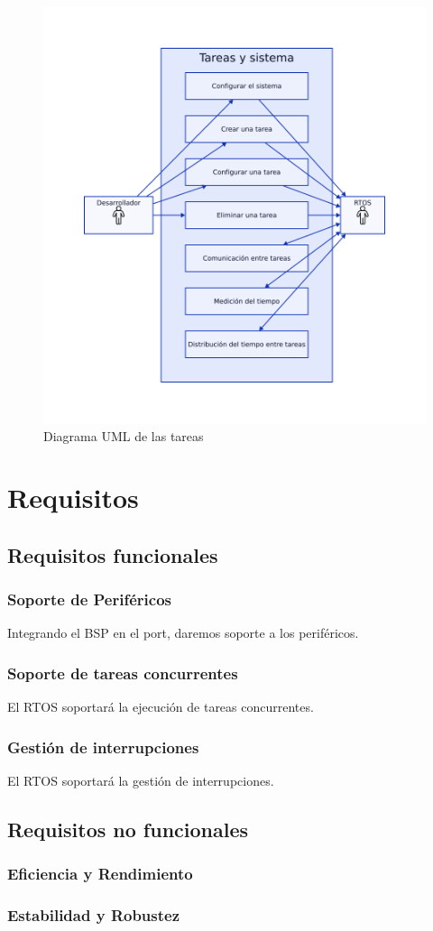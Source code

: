 \begin{figure}[h]
\centering
\includegraphics[width=\textwidth]{img/UML1.png}
\caption{Diagrama UML de las tareas}
\label{fig:UML1}
\end{figure}

\section{Requisitos}
\subsection{Requisitos funcionales}

\subsubsection{Soporte de Periféricos}
Integrando el BSP en el port, daremos soporte a los periféricos.

\subsubsection{Soporte de tareas concurrentes}
El RTOS soportará la ejecución de tareas concurrentes.

\subsubsection{Gestión de interrupciones}
El RTOS soportará la gestión de interrupciones.


\subsection{Requisitos no funcionales}
\subsubsection{Eficiencia y Rendimiento}
\subsubsection{Estabilidad y Robustez}

